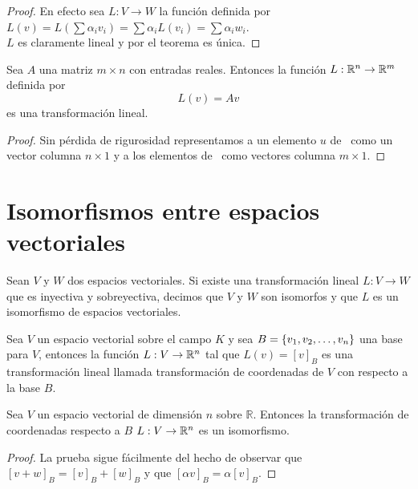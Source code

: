 \begin{proof}
En efecto sea $L: V \to W$ la función definida por $L(v) = L(\sum \alpha_i v_i) = \sum \alpha_i L(v_i) = \sum \alpha_i w_i$.
\\
$L$ es claramente lineal y por el teorema %
es única.
\end{proof}

\begin{theorem}
Sea $A$ una matriz $m \times n$ con entradas reales. Entonces la función $L : \mathbb{R}^n \to \mathbb{R}^m $ definida por $$L(v)= A v$$
es una transformación lineal.
\end{theorem}

\begin{proof}
Sin pérdida de rigurosidad representamos a un elemento $u$ de \rn \ como un vector columna $n \times 1$ y a los elementos de \rmm \ como vectores columna $m \times 1$.
\end{proof}

\section{Isomorfismos entre espacios vectoriales}
\begin{dfn}
Sean $V$ y $W$ dos espacios vectoriales. Si existe una transformación lineal $L : V \to W$ que es inyectiva y sobreyectiva, decimos que $V$ y $W$ son isomorfos y que $L$ es un isomorfismo de espacios vectoriales.
\end{dfn}

\begin{dfn}
Sea $V$ un espacio vectorial sobre el campo $K$ y sea $B =  \lbrace v_1, v_2, \ldots, v_n \rbrace$ una base para $V$, entonces la función $L : V \to \mathbb{R}^n$ tal que $L(v) = [v]_B$ es una transformación lineal llamada transformación de coordenadas de $V$ con respecto a la base $B$.
\end{dfn}

\begin{theorem}
Sea $V$ un espacio vectorial de dimensión $n$ sobre $\mathbb{R}$. Entonces la transformación de coordenadas respecto a $B$ $L : V \to \mathbb{R}^n$ es un isomorfismo.
\end{theorem}

\begin{proof}
La prueba sigue fácilmente del hecho de observar que $[v + w]_B = [v]_B + [w]_B$ y que $[\alpha v]_B = \alpha [v]_B$.
\end{proof}

